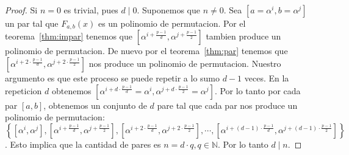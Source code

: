 \documentclass[12pt]{article}
\begin{document}
\begin{proof}
    Si $n=0$ es trivial, pues $d\mid 0$. Suponemos que $n\neq 0$. Sea $[a=\alpha^i,b=\alpha^j]$ un par tal que $F_{a,b}(x)$ es un polinomio de permutacion. Por el teorema~\ref{thm:impar} tenemos que $[\alpha^{i+\frac{p-1}{d}},\alpha^{j+\frac{p-1}{2}}]$ tambien produce un polinomio de permutacion. De nuevo por el teorema~\ref{thm:par} tenemos que $[\alpha^{i+2\cdot \frac{p-1}{d}},\alpha^{j+2\cdot\frac{p-1}{2}}]$ nos produce un polinomio de permutacion. Nuestro argumento es que este proceso se puede repetir a lo sumo $d-1$ veces. En la repeticion $d$ obtenemos $[\alpha^{i+d\cdot\frac{p-1}{d}}=\alpha^i,\alpha^{j+d\cdot \frac{p-1}{2}}=\alpha^j]$. Por lo tanto por cada par $[a,b]$, obtenemos un conjunto de $d$ pare tal que cada par nos produce un polinomio de permutacion: $\left\{ [\alpha^i,\alpha^j],[\alpha^{i+\frac{p-1}{d}},\alpha^{j+\frac{p-1}{2}}], [\alpha^{i+2\cdot \frac{p-1}{d}},\alpha^{j+2\cdot \frac{p-1}{2}}], \cdots, [\alpha^{i+(d-1)\cdot \frac{p-1}{d}},\alpha^{j+(d-1)\cdot \frac{p-1}{2}}] \right\}$. Esto implica que la cantidad de pares es $n=d\cdot q, q \in \mathbb{N}$. Por lo tanto $d\mid n$.
\end{proof}
\end{document}
